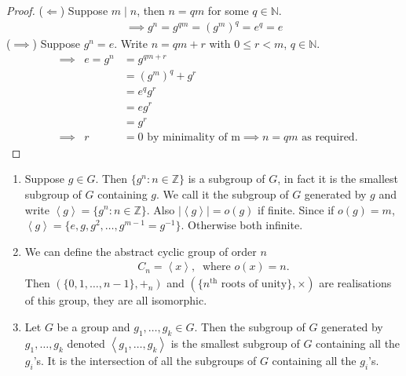 \begin{proof} \mbox{}
($\Longleftarrow$) Suppose $m \mid n$, then $n = qm$ for some $q \in \mathbb{N}$.
\begin{align*}
    \implies g^n = g^{qm} = (g^m)^q = e^q = e
\end{align*}
($\implies$) Suppose $g^n = e$. Write $n = qm + r$ with $0 \leq r < m$, $q \in \mathbb{N}$.
\begin{align*}
    &\implies & e = g^n &= g^{qm + r} \\
    && &= (g^m)^q + g^r \\
    && &= e^q g^r \\
    && &= e g^r \\
    && &= g^r \\
    &\implies & r &= 0 \text{ by minimality of m} \implies n = qm \text{ as required.} 
\end{align*}
\end{proof}

\begin{remark} \mbox{}
\begin{enumerate}
\def\labelenumi{\roman{enumi}.}
\item
  Suppose $g \in G$. Then $\{ g^n : n \in \mathbb{Z} \}$ is a subgroup of $G$, in fact it is the smallest subgroup of $G$ containing $g$.
  We call it the subgroup of $G$ generated by $g$ and write $\left\langle g \right\rangle = \{ g^n : n \in \mathbb{Z} \}$. Also $|\left\langle g \right\rangle| = o(g)$ if finite.
  Since if $o(g) = m$, $\left\langle g \right\rangle = \{ e, g, g^2, \ldots, g^{m-1} = g^{-1 }\}$.
  Otherwise both infinite.
\item
  We can define the abstract cyclic group of order $n$
  \begin{align*}
  C_n = \left\langle x \right\rangle,\ \text{ where } o(x) = n.
  \end{align*}
  Then $( \{ 0, 1, \ldots, n-1 \}, +_n)$ and $( \{ n^{\text{th}} \text{ roots of unity}\}, \times)$ are realisations of this group, they are all isomorphic.
\item
  Let $G$ be a group and $g_1, \ldots, g_k \in G$. Then the subgroup of $G$ generated by $g_1, \ldots, g_k$ denoted $\left\langle g_1, \ldots, g_k \right\rangle$ is the smallest subgroup of $G$ containing all the $g_i$'s. It is the intersection of all the subgroups of $G$ containing all the $g_i$'s.
\end{enumerate}

\end{remark}
